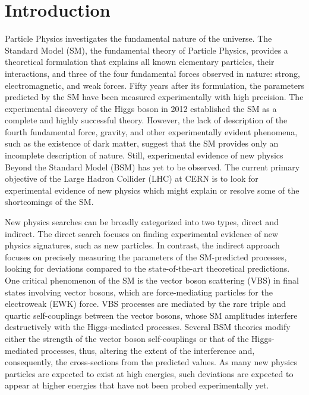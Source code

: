 \part{\LARGE{Introduction}}
\label{sec:Introduction}
Particle Physics investigates the fundamental nature of the universe. The Standard Model (SM), the fundamental theory of Particle Physics, provides a theoretical formulation that explains all known elementary particles, their interactions, and three of the four fundamental forces observed in nature: strong, electromagnetic, and weak forces. Fifty years after its formulation, the parameters predicted by the SM have been measured experimentally with high precision. The experimental discovery of the Higgs boson in 2012 established the SM as a complete and highly successful theory. However, the lack of description of the fourth fundamental force, gravity, and other experimentally evident phenomena, such as the existence of dark matter, suggest that the SM provides only an incomplete description of nature. Still, experimental evidence of new physics Beyond the Standard Model (BSM) has yet to be observed. The current primary objective of the Large Hadron Collider (LHC) at CERN is to look for experimental evidence of new physics which might explain or resolve some of the shortcomings of the SM. 

New physics searches can be broadly categorized into two types, direct and indirect. The direct search focuses on finding experimental evidence of new physics signatures, such as new particles. In contrast, the indirect approach focuses on precisely measuring the parameters of the SM-predicted processes, looking for deviations compared to the state-of-the-art theoretical predictions. One critical phenomenon of the SM is the vector boson scattering (VBS) in final states involving vector bosons, which are force-mediating particles for the electroweak (EWK) force. VBS processes are mediated by the rare triple and quartic self-couplings between the vector bosons, whose SM amplitudes interfere destructively with the Higgs-mediated processes. Several BSM theories modify either the strength of the vector boson self-couplings or that of the Higgs-mediated processes, thus, altering the extent of the interference and, consequently, the cross-sections from the predicted values. As many new physics particles are expected to exist at high energies, such deviations are expected to appear at higher energies that have not been probed experimentally yet. 

